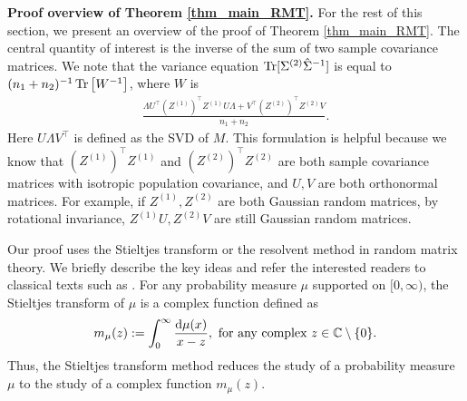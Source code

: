  


\textbf{Proof overview of Theorem \ref{thm_main_RMT}.}
For the rest of this section, we present an overview of the proof of Theorem \ref{thm_main_RMT}.
The central quantity of interest is the inverse of the sum of two sample covariance matrices.
We note that the variance equation $\operatorname{Tr}[\Sigma^{(2)} \hat{\Sigma}^{-1}]$ is equal to $(n_1 + n_2)^{-1} \operatorname{Tr}\left[W^{-1}\right]$, where $W$ is
\begin{align}\label{eigen2extra}
	\frac{\Lambda U^\top (Z^{(1)})^\top Z^{(1)} U\Lambda  + V^\top (Z^{(2)})^\top Z^{(2)}V}{n_1 + n_2}.
\end{align}
Here $U\Lambda V^\top$ is defined as the SVD of $M$.
This formulation is helpful because we know that $(Z^{(1)})^{\top} Z^{(1)}$ and $(Z^{(2)})^{\top} Z^{(2)}$ are both sample covariance matrices with isotropic population covariance, and $U, V$ are both orthonormal matrices.
For example, if $Z^{(1)},Z^{(2)}$ are both Gaussian random matrices, by rotational invariance, $Z^{(1)} U, Z^{(2)}V$ are still Gaussian random matrices.

Our proof uses the Stieltjes transform or the resolvent method in random matrix theory.
We briefly describe the key ideas and refer the interested readers to classical texts such as  \citet{bai2009spectral,tao2012topics,erdos2017dynamical}.
For any probability measure $\mu$ supported on $[0,\infty)$, the Stieltjes transform of $\mu$ is a complex function defined as
$$m_\mu(z):= \int_0^\infty \frac{\mathrm{d}\mu(x)}{x-z}, \text{ for any complex } z\in \mathbb{C}\setminus \{0\}.$$
Thus, the Stieltjes transform method reduces the study of a probability measure $\mu$ to the study of a complex function $m_\mu(z)$.



